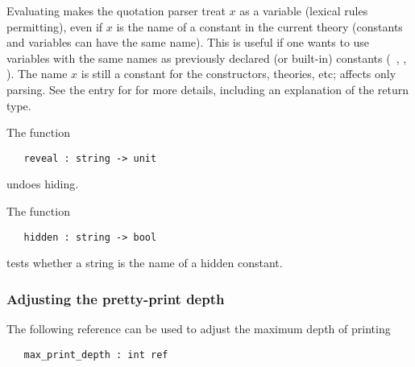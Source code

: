 {\noindent Evaluating 
makes the quotation parser treat $x$ as a variable (lexical
rules permitting), even if $x$ is the name of a constant in the current theory
(constants and variables can have the same name).
This is useful if one wants to use variables
%
%
with the same names as previously declared (or built-in) constants
(\eg\ , ,  \etc).  The name $x$ is still a constant
for the constructors, theories, etc;  affects only parsing.
See the \REFERENCE{} entry for  for more details, including
an explanation of the return type.

The function

\begin{boxed}
\begin{verbatim}
   reveal : string -> unit
\end{verbatim}
\end{boxed}

\noindent undoes hiding.

The function

\begin{boxed}
\begin{verbatim}
   hidden : string -> bool
\end{verbatim}
\end{boxed}

\noindent tests whether a string is the name of a hidden constant.

\subsubsection{Adjusting the pretty-print depth}

The following \ML{} reference can be used to adjust the maximum depth
of printing

\begin{boxed}
\begin{verbatim}
   max_print_depth : int ref
\end{verbatim}
\end{boxed}

}
